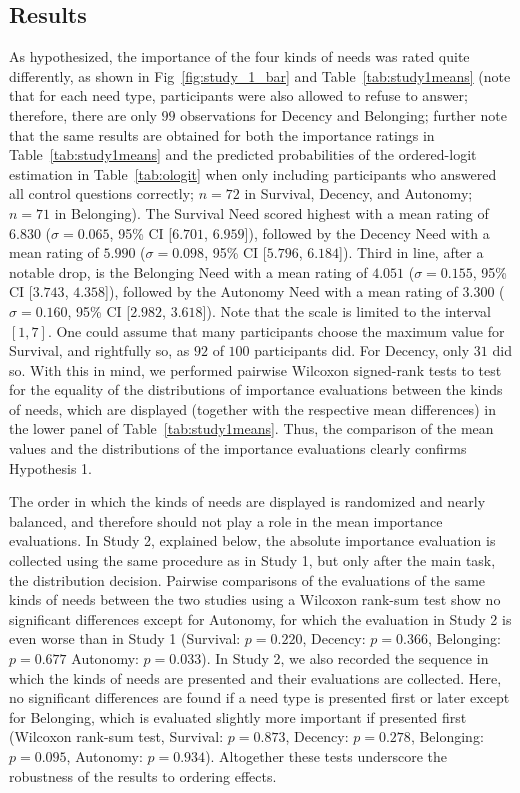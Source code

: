 \documentclass[10pt,letterpaper]{article}
\begin{document}
\subsection*{Results}
As hypothesized, the importance of the four kinds of needs was rated quite differently, as shown in Fig~\ref{fig:study_1_bar} and Table~\ref{tab:study1means} (note that for each need type, participants were also allowed to refuse to answer; therefore, there are only $99$ observations for Decency and Belonging; further note that the same results are obtained for both the importance ratings in Table~\ref{tab:study1means} and the predicted probabilities of the ordered-logit estimation in Table~\ref{tab:ologit} when only including participants who answered all control questions correctly; $n=72$ in Survival, Decency, and Autonomy; $n=71$ in Belonging).
The Survival Need scored highest with a mean rating of $6.830$ ($\sigma=0.065$, 95\% CI [$6.701$, $6.959$]), followed by the Decency Need with a mean rating of $5.990$ ($\sigma=0.098$, 95\% CI [$5.796$, $6.184$]).
Third in line, after a notable drop, is the Belonging Need with a mean rating of $4.051$ ($\sigma=0.155$, 95\% CI [$3.743$, $4.358$]), followed by the Autonomy Need with a mean rating of $3.300$ ($\sigma=0.160$, 95\% CI [$2.982$, $3.618$]).
Note that the scale is limited to the interval $[1,7]$.
One could assume that many participants choose the maximum value for Survival, and rightfully so, as $92$ of $100$ participants did.
For Decency, only $31$ did so.
With this in mind, we performed pairwise Wilcoxon signed-rank tests to test for the equality of the distributions of importance evaluations between the kinds of needs, which are displayed (together with the respective mean differences) in the lower panel of Table~\ref{tab:study1means}.
Thus, the comparison of the mean values and the distributions of the importance evaluations clearly confirms Hypothesis 1.

The order in which the kinds of needs are displayed is randomized and nearly balanced, and therefore should not play a role in the mean importance evaluations.
In Study 2, explained below, the absolute importance evaluation is collected using the same procedure as in Study 1, but only after the main task, the distribution decision.
Pairwise comparisons of the evaluations of the same kinds of needs between the two studies using a Wilcoxon rank-sum test show no significant differences except for Autonomy, for which the evaluation in Study 2 is even worse than in Study 1 (Survival: $p=0.220$, Decency: $p=0.366$, Belonging: $p=0.677$ Autonomy: $p=0.033$).
In Study 2, we also recorded the sequence in which the kinds of needs are presented and their evaluations are collected.
Here, no significant differences are found if a need type is presented first or later except for Belonging, which is evaluated slightly more important if presented first (Wilcoxon rank-sum test, Survival: $p=0.873$, Decency: $p=0.278$, Belonging: $p=0.095$, Autonomy: $p=0.934$).
Altogether these tests underscore the robustness of the results to ordering effects.
\end{document}
